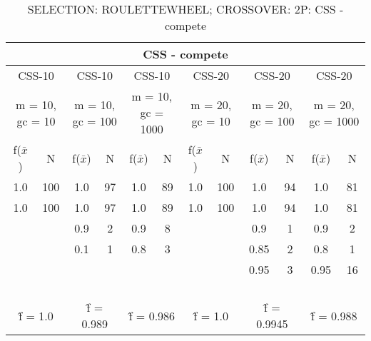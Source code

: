 \begin{table}[H]
	\centering
	\caption{SELECTION: ROULETTEWHEEL; CROSSOVER: 2P: CSS - compete}
	\begin{adjustbox}{width=1\textwidth}
		\begin{tabular}{ |c|c||c|c||c|c||c|c||c|c||c|c| }
			\hline
			\multicolumn{12}{|c|}{CSS - compete} \\
			\hline
			\multicolumn{2}{|c||}{CSS-10} & \multicolumn{2}{c||}{CSS-10} & \multicolumn{2}{c||}{CSS-10} & \multicolumn{2}{c||}{CSS-20} & \multicolumn{2}{c||}{CSS-20} & \multicolumn{2}{c|}{CSS-20}\\
			\hline
			\multicolumn{2}{|c||}{m = 10, gc = 10} & \multicolumn{2}{c||}{m = 10, gc = 100} & \multicolumn{2}{c||}{m = 10, gc = 1000} & \multicolumn{2}{c||}{m = 20, gc = 10} & \multicolumn{2}{c||}{m = 20, gc = 100} & \multicolumn{2}{c|}{m = 20, gc = 1000}\\
			\hline
			f($\bar{x}$) & N & f($\bar{x}$) & N & f($\bar{x}$) & N & f($\bar{x}$) & N & f($\bar{x}$) & N & f($\bar{x}$) & N\\
			\hline
			\hline
			1.0 & 100 & 1.0 & 97 & 1.0 & 89 & 1.0 & 100 & 1.0 & 94 & 1.0 & 81\\
			\hline
			1.0 & 100 & 1.0 & 97 & 1.0 & 89 & 1.0 & 100 & 1.0 & 94 & 1.0 & 81\\
			&   & 0.9 & 2 & 0.9 & 8 &   &   & 0.9 & 1 & 0.9 & 2\\
			&   & 0.1 & 1 & 0.8 & 3 &   &   & 0.85 & 2 & 0.8 & 1\\
			&   &   &   &   &   &   &   & 0.95 & 3 & 0.95 & 16\\
			&   &   &   &   &   &   &   &   &   &   &  \\
			&   &   &   &   &   &   &   &   &   &   &  \\
			&   &   &   &   &   &   &   &   &   &   &  \\
			&   &   &   &   &   &   &   &   &   &   &  \\
			\hline
			\multicolumn{2}{|c||}{\^{f} = 1.0} & \multicolumn{2}{c||}{\^{f} = 0.989} & \multicolumn{2}{c||}{\^{f} = 0.986} & \multicolumn{2}{c||}{\^{f} = 1.0} & \multicolumn{2}{c||}{\^{f} = 0.9945} & \multicolumn{2}{c|}{\^{f} = 0.988}\\
			\hline
		\end{tabular}
	\end{adjustbox}
\end{table}
